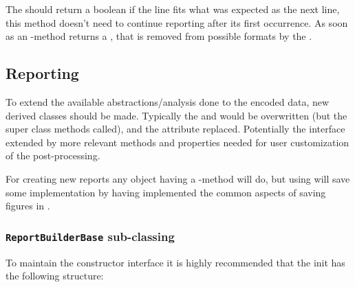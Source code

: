 \documentclass[letterpaper,10pt,english]{sphinxmanual}
\begin{document}
The  should return a boolean if the line fits what was
expected as the next line, this method doesn't need to continue
reporting  after its first occurrence.
As soon as an -method returns a , that  is
removed from possible formats by the
{\hyperref[fseq.reading:fseq.reading.seq_encoder.SeqFormatDetector]{}}.


\subsection{Reporting}
\label{developers:reporting}
To extend the available abstractions/analysis done to the encoded
data, new derived {\hyperref[fseq.reporting:fseq.reporting.report_builder.ReportBuilderBase]{}}
classes should be made.
Typically the  and  would be overwritten (but the super
class methods called), and the  attribute replaced.
Potentially the interface extended by more relevant methods and properties
needed for user customization of the post-processing.

For creating new reports any object having a -method will do, but
using {\hyperref[fseq.reporting:fseq.reporting.reports.ReportBase]{}} will save some implementation
by having implemented the common aspects of saving figures in .


\subsubsection{\texttt{ReportBuilderBase} sub-classing}
\label{developers:reportbuilderbase-sub-classing}
To maintain the constructor interface it is highly recommended that the init
has the following structure:
\end{document}
